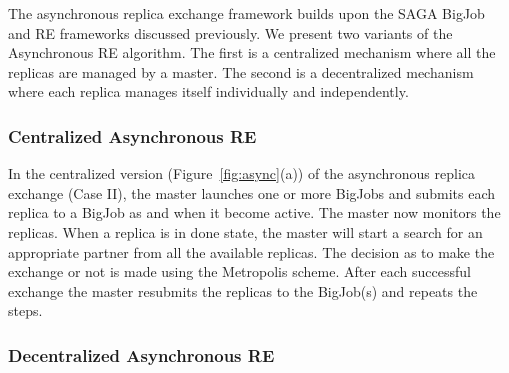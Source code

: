 \documentclass[a4paper,10pt]{article}
\newcommand{\alnote}[1]{ {\textcolor{blue} { ***andre: #1 }}}
\newcommand{\athotanote}[1]{ {\textcolor{green} { ***athota: #1 }}}
\newcommand{\alnote}[1]{}
\newcommand{\athotanote}[1]{}
\begin{document}
The asynchronous replica exchange framework builds upon the SAGA BigJob and RE frameworks discussed previously.
We present two variants of the Asynchronous RE algorithm. The first is a centralized 
mechanism where all the replicas are managed by a master. %
The second is a decentralized mechanism where each replica manages itself individually and independently.%


\subsubsection{Centralized Asynchronous RE}



In the centralized version (Figure~\ref{fig:async}(a)) of the
asynchronous replica exchange (Case II), the master launches one or more BigJobs and submits each replica to a BigJob as and when
it become active. The master now monitors the replicas. When a replica is in done state, the master
will start a search for an appropriate partner from all the available
replicas. The decision as to make the exchange or not is made using
the Metropolis scheme.  %
After each successful exchange the master resubmits the replicas
to the BigJob(s) and repeats the steps.

\subsubsection{Decentralized Asynchronous RE}
\end{document}
